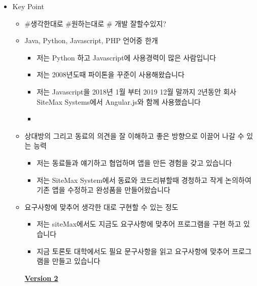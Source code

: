 \documentclass[12pt]{article}
\begin{document}
\begin{itemize}
    \item Key Point
    \begin{itemize}
        \item \#생각한대로 \#원하는대로 \# 개발 잘할수있지?
        \item Java, Python, Javascript, PHP 언어중 한개
        \begin{itemize}
            \item 저는 Python 하고 Javascript에 사용경력이 많은 사람입니다
            \item 저는 2008년도때 파이톤을 꾸준이 사용해왔습니다
            \item 저는 Javascript을 2018년 1월 부터 2019 12월 말까지 2년동안 회사 SiteMax Systems에서 Angular.js와 함께 사용했습니다
            \item
        \end{itemize}
        \item 상대방의 그리고 동료의 의견을 잘 이해하고 좋은 방향으로 이끌어 나갈 수 있는 능력
        \begin{itemize}
            \item 저는 동료들과 얘기하고 협업하며 앱을 만든 경험을 갖고 있습니다
            \item 저는 SiteMax System에서 동료와 코드리뷰할때 경청하고 작게 논의하여 기존 앱을 수정하고 완성품을 만들어왔습니다
        \end{itemize}
        \item 요구사항에 맞추어 생각한 대로 구현할 수 있는 정도
        \begin{itemize}
            \item 저는 siteMax에서도 지금도 요구사항에 맞추어 프로그램을 구현 하고 있습니다
            \item 지금 토론토 대학에서도 필요 문구사항을 읽고 요구사항에 맞추어 프로그램을 만들고 있습니다
        \end{itemize}

        \bigskip

        \underline{\textbf{Version 2}}

        \bigskip


\end{itemize}
\end{itemize}
\end{document}
